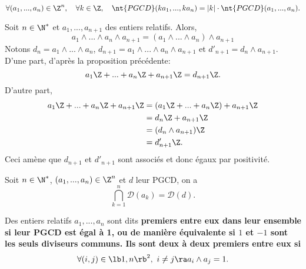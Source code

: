 \documentclass[11pt]{article}
\newcommand*{\PGCD}{\nt{PGCD}}
\renewcommand*{\D}{\mathcal{D}}
\begin{document}
\begin{prop}{}{}
    \begin{equation*}
        \forall (a_1,...,a_n)\in\Z^n, \quad \forall k \in \Z, \quad \PGCD(ka_1,...,ka_n)=|k|\cdot\PGCD(a_1,...,a_n).
    \end{equation*}
\end{prop}

\begin{prop}{}{}
    Soit $n\in\N^*$ et $a_1,...,a_{n+1}$ des entiers relatifs. Alors,
    \begin{equation*}
        a_1\land...\land a_n\land a_{n+1}=(a_1\land ... \land a_n) \land a_{n+1}
    \end{equation*}
    \tcblower
    Notons $d_n=a_1\land ... \land a_n$, $d_{n+1}=a_1\land...\land a_n \land a_{n+1}$ et $d'_{n+1}=d_n\land a_{n+1}$.\\
    D'une part, d'après la proposition précédente:
    \begin{equation*}
        a_1\Z+...+a_n\Z+a_{n+1}\Z=d_{n+1}\Z.
    \end{equation*}
    D'autre part,
    \begin{align*}
        a_1\Z+...+a_n\Z+a_{n+1}\Z&=(a_1\Z+...+a_n\Z)+a_{n+1}\Z\\
        &=d_n\Z+a_{n+1}\Z\\
        &=(d_n\land a_{n+1})\Z\\
        &= d'_{n+1}\Z.
    \end{align*}
    Ceci amène que $d_{n+1}$ et $d'_{n+1}$ sont associés et donc égaux par positivité.
\end{prop}

\begin{prop}{}{}
    Soit $n\in\N^*$, $(a_1,...,a_n)\in\Z^n$ et $d$ leur PGCD, on a
    \begin{equation*}
        \bigcap_{k=1}^n\D(a_k)=\D(d).
    \end{equation*}
\end{prop}

\begin{defi}{}{}
    Des entiers relatifs $a_1,...,a_n$ sont dits \bf{premiers entre eux dans leur ensemble} si leur PGCD est égal à 1, ou de manière équivalente si $1$ et $-1$ sont les seuls diviseurs communs.\n
    Ils sont \bf{deux à deux premiers entre eux} si
    \begin{equation*}
        \forall (i,j) \in \lb1,n\rb^2, ~ i \neq j \ra a_i \land a_j = 1.
    \end{equation*}
\end{defi}
\end{document}
